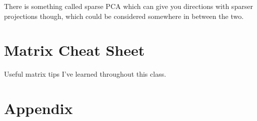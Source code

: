 \documentclass[11 pt]{scrartcl}
\begin{document}
There is something called sparse PCA which can give you directions with sparser projections though, which could be considered somewhere in between the two.

\newpage
\section{Matrix Cheat Sheet}
Useful matrix tips I've learned throughout this class. 


\section{Appendix}
\renewcommand{\listtheoremname}{List of Definitions and Theorems}
\listoftheorems[ignoreall,show={theorem,definition}]

\listoftodos
\end{document}
